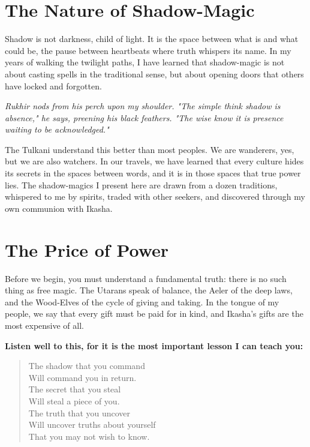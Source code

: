 \documentclass[12pt,twoside]{book}
\newcommand{\shadow}[1]{\textit{#1}}
\newcommand{\whisper}[1]{\textbf{#1}}
\begin{document}
\section*{The Nature of Shadow-Magic}

Shadow is not darkness, child of light. It is the space between what is and what could be, the pause between heartbeats where truth whispers its name. In my years of walking the twilight paths, I have learned that shadow-magic is not about casting spells in the traditional sense, but about opening doors that others have locked and forgotten.

\shadow{Rukhir nods from his perch upon my shoulder. "The simple think shadow is absence," he says, preening his black feathers. "The wise know it is presence waiting to be acknowledged."}

The Tulkani understand this better than most peoples. We are wanderers, yes, but we are also watchers. In our travels, we have learned that every culture hides its secrets in the spaces between words, and it is in those spaces that true power lies. The shadow-magics I present here are drawn from a dozen traditions, whispered to me by spirits, traded with other seekers, and discovered through my own communion with Ikasha.

\section*{The Price of Power}

Before we begin, you must understand a fundamental truth: there is no such thing as free magic. The Utarans speak of balance, the Aeler of the deep laws, and the Wood-Elves of the cycle of giving and taking. In the tongue of my people, we say that every gift must be paid for in kind, and Ikasha's gifts are the most expensive of all.

\whisper{Listen well to this, for it is the most important lesson I can teach you:}

\begin{verse}
The shadow that you command \\
Will command you in return. \\
The secret that you steal \\
Will steal a piece of you. \\
The truth that you uncover \\
Will uncover truths about yourself \\
That you may not wish to know.
\end{verse}
\end{document}
